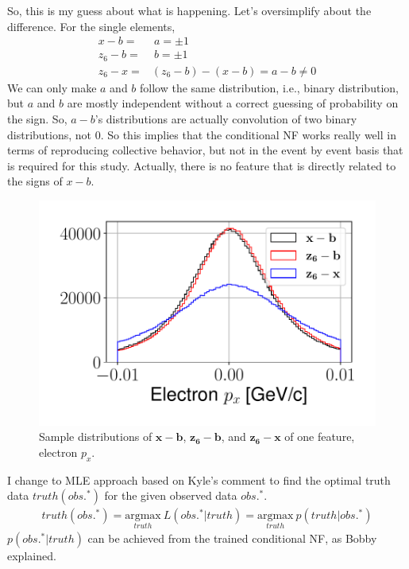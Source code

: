 So, this is my guess about what is happening. Let's oversimplify about the difference. For the single elements,
\begin{align}
    x -b =& ~a = \pm 1\\
    z_6-b =& ~b = \pm 1\\
    z_6 -x =& (z_6-b) - (x-b) = a- b \neq 0
\end{align}
We can only make $a$ and $b$ follow the same distribution, i.e., binary distribution, but $a$ and $b$ are mostly independent without a correct guessing of probability on the sign. So, $a-b$'s distributions are actually convolution of two binary distributions, not 0. So this implies that the conditional NF works really well in terms of reproducing collective behavior, but not in the event by event basis that is required for this study. Actually, there is no feature that is directly related to the signs of $x-b$.


\begin{figure}[htb]
    \centering
    \includegraphics{Chapters/Ch3-Simulations/normalizing_flows/pics/MeetingFigures/Sangbaek/elec_px.pdf}
    \caption[Placeholder Short text]{Sample distributions of $\mathbf{x}-\mathbf{b}$, $\mathbf{z_6}-\mathbf{b}$, and $\mathbf{z_6}-\mathbf{x}$ of one feature, electron $p_x$.}
    \label{fig:electron_px}
\end{figure}


I change to MLE approach based on Kyle's comment to find the optimal truth data $truth(obs.^{*})$ for the given observed data $obs.^{*}$. 
\begin{align}
truth(obs.^{*}) = \underset{truth}{\text{argmax}}~ L(obs.^{*}|truth) = \underset{truth}{\text{argmax}}~ p(truth|obs.^{*}) 
\end{align}
$p(obs.^{*}|truth)$ can be achieved from the trained conditional NF, as Bobby explained.







